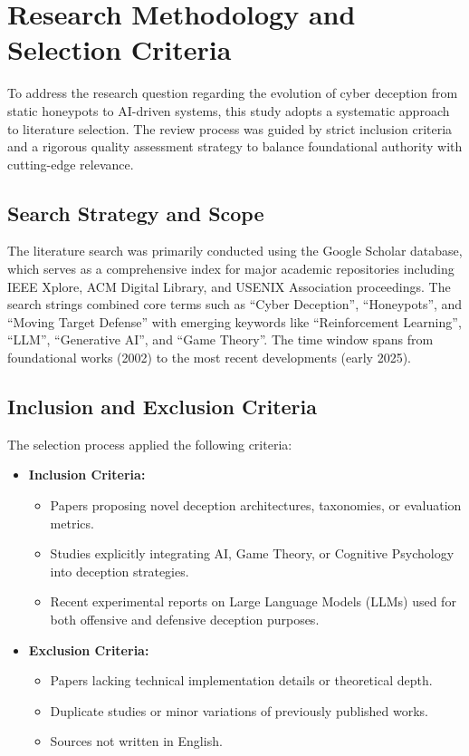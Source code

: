 \section{Research Methodology and Selection Criteria}
To address the research question regarding the evolution of cyber deception from static honeypots to AI-driven systems,
this study adopts a systematic approach to literature selection.
The review process was guided by strict inclusion criteria and a rigorous quality assessment strategy to balance foundational
authority with cutting-edge relevance.

\subsection{Search Strategy and Scope}
The literature search was primarily conducted using the Google Scholar database,
which serves as a comprehensive index for major academic repositories including IEEE Xplore,
ACM Digital Library, and USENIX Association proceedings. The search strings combined core terms such as ``Cyber Deception'',
``Honeypots'', and ``Moving Target Defense'' with emerging keywords like ``Reinforcement Learning'', ``LLM'', ``Generative AI'',
and ``Game Theory''. The time window spans from foundational works (2002) to the most recent developments (early 2025).
\subsection{Inclusion and Exclusion Criteria}
The selection process applied the following criteria:
\begin{itemize}
      \item \textbf{Inclusion Criteria:}
            \begin{itemize}
                  \item Papers proposing novel deception architectures, taxonomies, or evaluation metrics.
                  \item Studies explicitly integrating AI, Game Theory, or Cognitive Psychology into deception strategies.
                  \item Recent experimental reports on Large Language Models (LLMs) used for both offensive
                        and defensive deception purposes.
            \end{itemize}
      \item \textbf{Exclusion Criteria:}
            \begin{itemize}
                  \item Papers lacking technical implementation details or theoretical depth.
                  \item Duplicate studies or minor variations of previously published works.
                  \item Sources not written in English.
            \end{itemize}
\end{itemize}

